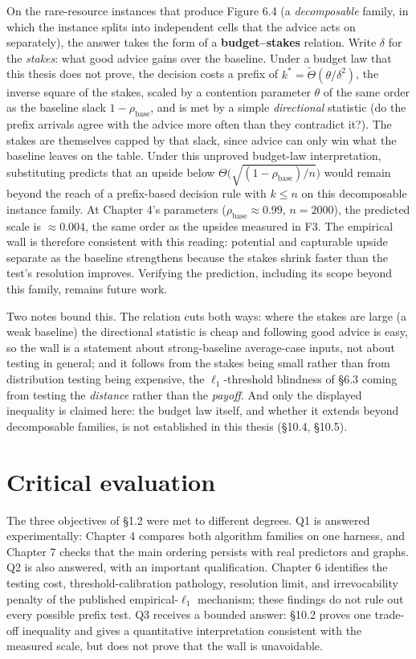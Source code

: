 On the rare-resource instances that produce Figure 6.4 (a
\emph{decomposable} family, in which the instance splits into
independent cells that the advice acts on separately), the answer takes
the form of a \textbf{budget--stakes} relation. Write \(\delta\) for the
\emph{stakes}: what good advice gains over the baseline. Under a budget
law that this thesis does not prove, the decision costs a prefix of
\(k^* = \tilde\Theta(\theta/\delta^2)\), the inverse square of the
stakes, scaled by a contention parameter \(\theta\) of the same order as
the baseline slack \(1-\rho_{\mathrm{base}}\), and is met by a simple
\emph{directional} statistic (do the prefix arrivals agree with the
advice more often than they contradict it?). The stakes are themselves
capped by that slack, since advice can only win what the baseline leaves
on the table. Under this unproved budget-law interpretation,
substituting predicts that an upside below
\(\Theta\bigl(\sqrt{(1-\rho_{\mathrm{base}})/n}\bigr)\) would remain
beyond the reach of a prefix-based decision rule with \(k \le n\) on
this decomposable instance family. At Chapter 4's parameters
(\(\rho_{\mathrm{base}}\approx0.99\), \(n=2000\)), the predicted scale
is \(\approx0.004\), the same order as the upsides measured in F3. The
empirical wall is therefore consistent with this reading: potential and
capturable upside separate as the baseline strengthens because the
stakes shrink faster than the test's resolution improves. Verifying the
prediction, including its scope beyond this family, remains future work.

Two notes bound this. The relation cuts both ways: where the stakes are
large (a weak baseline) the directional statistic is cheap and following
good advice is easy, so the wall is a statement about strong-baseline
average-case inputs, not about testing in general; and it follows from
the stakes being small rather than from distribution testing being
expensive, the \(\ell_1\)-threshold blindness of §6.3 coming from
testing the \emph{distance} rather than the \emph{payoff}. And only the
displayed inequality is claimed here: the budget law itself, and whether
it extends beyond decomposable families, is not established in this
thesis (§10.4, §10.5).

\section{Critical evaluation}

The three objectives of §1.2 were met to different degrees. Q1 is
answered experimentally: Chapter 4 compares both algorithm families on
one harness, and Chapter 7 checks that the main ordering persists with
real predictors and graphs. Q2 is also answered, with an important
qualification. Chapter 6 identifies the testing cost,
threshold-calibration pathology, resolution limit, and irrevocability
penalty of the published empirical-\(\ell_1\) mechanism; these findings
do not rule out every possible prefix test. Q3 receives a bounded
answer: §10.2 proves one trade-off inequality and gives a quantitative
interpretation consistent with the measured scale, but does not prove
that the wall is unavoidable.

